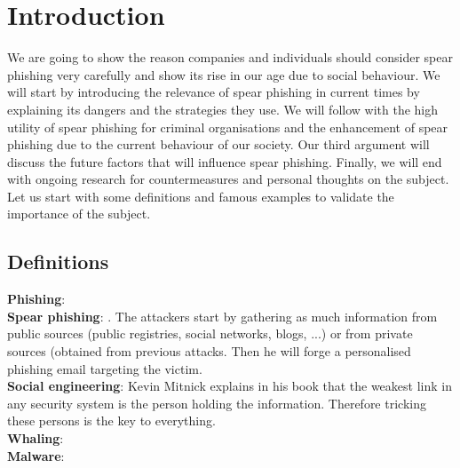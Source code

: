\documentclass[12pt]{article} %
\begin{document}

\section{Introduction}
We are going to show the reason companies and individuals should consider spear phishing very carefully and show its rise in our age due to social behaviour. We will start by introducing the relevance of spear phishing in current times by explaining its dangers and the strategies they use. We will follow with the high utility of spear phishing for criminal organisations and the enhancement of spear phishing due to the current behaviour of our society. Our third argument will discuss the future factors that will influence spear phishing. Finally, we will end with ongoing research for countermeasures and personal thoughts on the subject.\\
Let us start with some definitions and famous examples to validate the importance of the subject.
\subsection{Definitions}
\textbf{Phishing}:  \cite{phishing definition}\\
\textbf{Spear phishing}: . The attackers start by gathering as much information from public sources (public registries, social networks, blogs, ...) or from private sources (obtained from previous attacks. Then he will forge a personalised phishing email targeting the victim.\cite{spear phishing definition,spear phishing def}\\
\textbf{Social engineering}: Kevin Mitnick explains in his book that the weakest link in any security system is the person holding the information. Therefore tricking these persons is the key to everything. \cite{social engineering definition, mitnick}\\
\textbf{Whaling}:  \cite{whaling definition,wiki whaling definition}\\
\textbf{Malware}:  \cite{malware definition}\\
\end{document}

